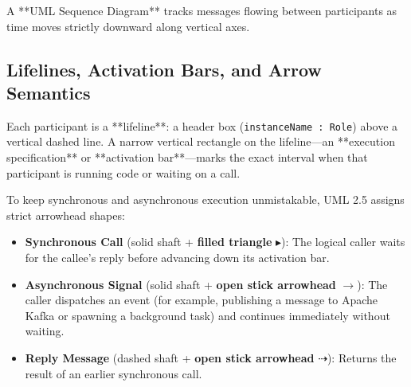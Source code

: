 A **UML Sequence Diagram** tracks messages flowing between participants as time moves strictly downward along vertical axes.

\subsection{Lifelines, Activation Bars, and Arrow Semantics}

Each participant is a **lifeline**: a header box (\texttt{instanceName : Role}) above a vertical dashed line. A narrow vertical rectangle on the lifeline---an **execution specification** or **activation bar**---marks the exact interval when that participant is running code or waiting on a call.

To keep synchronous and asynchronous execution unmistakable, UML 2.5 assigns strict arrowhead shapes:
\begin{itemize}[leftmargin=18pt]
  \item \textbf{Synchronous Call} (solid shaft + \textbf{filled triangle} $\blacktriangleright$): The logical caller waits for the callee's reply before advancing down its activation bar.
  \item \textbf{Asynchronous Signal} (solid shaft + \textbf{open stick arrowhead} $\rightarrow$): The caller dispatches an event (for example, publishing a message to Apache Kafka or spawning a background task) and continues immediately without waiting.
  \item \textbf{Reply Message} (dashed shaft + \textbf{open stick arrowhead} $\dashrightarrow$): Returns the result of an earlier synchronous call.
\end{itemize}


